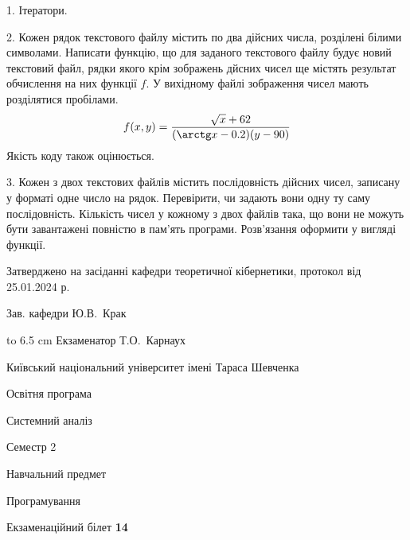 \documentclass[12pt, ukrainian]{article}
\begin{document}
{%
1. Ітератори.%
\par
\vspace{2mm}

2. Кожен рядок текстового файлу містить по два дійсних числа, розділені білими символами.
Написати функцію, що для заданого текстового файлу будує новий текстовий файл, рядки якого крім зображень дйсних чисел ще містять результат обчислення на них функції $f$. У вихідному файлі зображення чисел мають розділятися пробілами. 
$$f(x, y) =\frac{\sqrt x + 62}{(\arctg x - 0.2) (y - 90)}$$ 
Якість коду також оцінюється.

\par
\vspace{2mm}

3. Кожен з двох текстових файлів містить послідовність дійсних чисел, записану у форматі одне число на рядок.  Перевірити, чи задають вони одну ту саму послідовність. Кількість чисел у кожному з двох файлів така, що вони не можуть бути завантажені повністю в пам'ять програми. Розв'язання оформити у вигляді функції.

}
{\smallskip\smallskip \begin {scriptsize} Затверджено на засіданні кафедри теоретичної кібернетики, протокол   від   25.01.2024 р.\par\smallskip\smallskip\smallskip\smallskip
{\parbox {6.5 cm} {Зав. кафедри \dotfill Ю.В.~Крак}}\hspace {0.7cm} {\hbox to 6.5 cm { Екзаменатор \dotfill Т.О.~Карнаух}} \end{scriptsize}}
\vspace{0.9cm}
{{\begin {scriptsize}\par
{ \center  Київський національний університет імені Тараса Шевченка \par}
{\parbox {5 cm}{Освітня програма \hfill}{\parbox {7 cm}{Системний аналіз\hfill}}\parbox {6 cm}{\hfill Семестр 2}}\par
{\parbox {5 cm} {Навчальний предмет \hfill}\parbox {7 cm}{Програмування \hfill}\parbox {6cm}{\hfill}\par}\vspace{-15pt} \end{scriptsize}}{\center Екзаменаційний білет \No \textbf { 14 }\par}}
\end{document}
